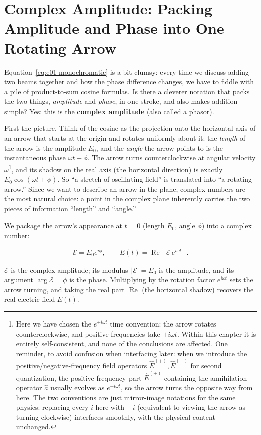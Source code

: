 \section{Complex Amplitude: Packing Amplitude and Phase into One Rotating Arrow}
\label{sec:e01-phasor}

Equation~\eqref{eq:e01-monochromatic} is a bit clumsy: every time we discuss adding two beams together and how the phase difference changes, we have to fiddle with a pile of product-to-sum cosine formulas. Is there a cleverer notation that packs the two things, \emph{amplitude} and \emph{phase}, in one stroke, and also makes addition simple? Yes: this is the \textbf{complex amplitude} (also called a phasor).

First the picture. Think of the cosine as the projection onto the horizontal axis of an arrow that starts at the origin and rotates uniformly about it: the \emph{length} of the arrow is the amplitude \(E_0\), and the \emph{angle} the arrow points to is the instantaneous phase \(\omega t+\phi\). The arrow turns counterclockwise at angular velocity \(\omega\)\footnote{Here we have chosen the \(e^{+i\omega t}\) time convention: the arrow rotates counterclockwise, and positive frequencies take \(+i\omega t\). Within this chapter it is entirely self-consistent, and none of the conclusions are affected. One reminder, to avoid confusion when interfacing later: when we introduce the positive/negative-frequency field operators \(\hat E^{(+)},\hat E^{(-)}\) for second quantization, the positive-frequency part \(\hat E^{(+)}\) containing the annihilation operator \(\hat a\) usually evolves as \(e^{-i\omega t}\), so the arrow turns the opposite way from here. The two conventions are just mirror-image notations for the same physics: replacing every \(i\) here with \(-i\) (equivalent to viewing the arrow as turning clockwise) interfaces smoothly, with the physical content unchanged.}, and its shadow on the real axis (the horizontal direction) is exactly \(E_0\cos(\omega t+\phi)\). So ``a stretch of oscillating field'' is translated into ``a rotating arrow.'' Since we want to describe an arrow in the plane, complex numbers are the most natural choice: a point in the complex plane inherently carries the two pieces of information ``length'' and ``angle.''

We package the arrow's appearance at \(t=0\) (length \(E_0\), angle \(\phi\)) into a complex number:

\begin{equation}
  \mathcal{E}=E_0e^{i\phi},\qquad E(t)=\operatorname{Re}\!\left[\mathcal{E}\,e^{i\omega t}\right].
  \label{eq:e01-phasor}
\end{equation}
\begin{formulaexplain}
\(\mathcal E\) is the complex amplitude; its modulus \(|\mathcal E|=E_0\) is the amplitude, and its argument \(\arg\mathcal E=\phi\) is the phase. Multiplying by the rotation factor \(e^{i\omega t}\) sets the arrow turning, and taking the real part \(\operatorname{Re}\) (the horizontal shadow) recovers the real electric field \(E(t)\).
\end{formulaexplain}

